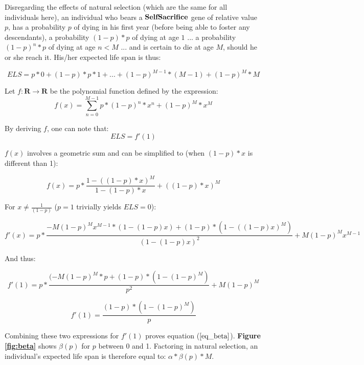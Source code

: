 \documentclass[a4paper,12pt]{article}
\begin{document}
Disregarding the effects of natural selection (which are the same for all individuals here),
 an individual who bears a $\bf{SelfSacrifice}$ gene of relative value $p$, has a probability $p$ of dying in his first year
 (before being able to foster any descendants), a probability $(1-p)*p$ of dying at age $1$ ...
 a probability $(1-p)^{n}*p$ of dying at age $n<M$ ... and is certain to die at age $M$, should
 he or she reach it. His/her expected life span is thus:

 \[ ELS = p*0 + (1-p)*p*1 + ... + (1-p)^{M-1}*(M-1) + (1-p)^M*M \]

Let $f \colon \mathbf{R} \to \mathbf{R}$ be the polynomial function defined by the expression:
\[ f(x) = \sum_{n=0}^{M-1} p*(1-p)^n*x^n + (1-p)^M*x^M \]

By deriving $f$, one can note that:
\begin{equation}
    ELS = f'(1)
\label{eq_ELS_f}
\end{equation}

$f(x)$ involves a geometric sum and can be simplified to (when $(1-p)*x$ is different than 1):

\[ f(x) = p* \frac{1 - ((1-p)*x)^M}{1-(1-p)*x} + ((1-p)*x)^M \]

For $x\neq\frac{1}{(1-p)}$ ($p=1$ trivially yields $ELS=0$):

\[ f'(x) = p * \frac{-M(1-p)^Mx^{M-1}*(1-(1-p)x) + (1-p)*(1-((1-p)x)^M)}{(1-(1-p)x)^2} + M(1-p)^Mx^{M-1} \]

And thus:

\[f'(1) = p * \frac{(-M(1-p)^M*p + (1-p)*(1-(1-p)^M)}{p^2} + M(1-p)^M \]

\begin{equation}
    f'(1) = \frac{(1-p)*(1-(1-p)^M)}{p}
\label{eq_f'}
\end{equation}

Combining these two expressions for $f'(1)$ proves equation ($\bf\ref{eq_beta}$). \textbf{Figure \ref{fig:beta}} shows
$\beta(p)$ for $p$ between 0 and 1. Factoring in natural selection, an individual's expected life span is therefore equal to: $\alpha*\beta(p)*M$.
\end{document}
